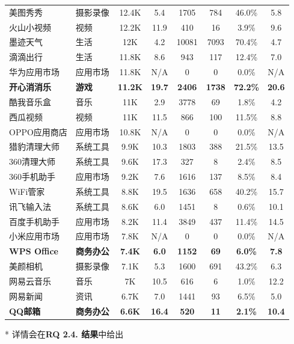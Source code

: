 \begin{ThreePartTable}
\begin{longtable}{l l c c c c c c}
美图秀秀 & 摄影录像 & 12.4K & 5.4 & 1705 & 784 & 46.0\% & 5.8 \\
\rowcolor{gray!15} 火山小视频 & 视频 & 12.2K & 11.9 & 410 & 16 & 3.9\% & 9.6 \\
墨迹天气 & 生活 & 12K & 4.2 & 10081 & 7093 & 70.4\% & 4.7 \\
\rowcolor{gray!15} 滴滴出行 & 生活 & 11.8K & 8.6 & 943 & 117 & 12.4\% & 7.0 \\
华为应用市场 & 应用市场 & 11.8K & N/A & 0 & 0 & 0.0\% & N/A\\
\rowcolor{gray!15} {\bf 开心消消乐}\tnote{*} & {\bf 游戏} & {\bf 11.2K} & {\bf 19.7} & {\bf 2406} & {\bf 1738} & {\bf 72.2\%} & {\bf 20.6} \\
酷我音乐盒 & 音乐 & 11K & 2.9 & 3778 & 69 & 1.8\% & 4.2 \\
\rowcolor{gray!15} 西瓜视频 & 视频 & 11K & 11.5 & 866 & 100 & 11.5\% & 8.8 \\
OPPO应用商店 & 应用市场 & 10.8K & N/A & 0 & 0 & 0.0\% & N/A\\
\rowcolor{gray!15} 猎豹清理大师 & 系统工具 & 9.9K & 10.3 & 1803 & 388 & 21.5\% & 13.5 \\
360清理大师 & 系统工具 & 9.6K & 17.3 & 327 & 8 & 2.4\% & 8.5 \\
\rowcolor{gray!15} 360手机助手 & 应用市场 & 9.2K & 7.6 & 1616 & 137 & 8.5\% & 8.4 \\
WiFi管家 & 系统工具 & 8.8K & 19.5 & 1636 & 658 & 40.2\% & 15.7 \\
\rowcolor{gray!15} 讯飞输入法 & 系统工具 & 8.6K & 6.0 & 1451 & 8 & 0.6\% & 10.1 \\
百度手机助手 & 应用市场 & 8.2K & 11.4 & 3849 & 437 & 11.4\% & 14.5 \\
\rowcolor{gray!15} 小米应用市场 & 应用市场 & 7.8K & N/A & 0 & 0 & 0.0\% & N/A\\
{\bf WPS Office}\tnote{*} & {\bf 商务办公} & {\bf 7.4K} & {\bf 6.0} & {\bf 1152} & {\bf 69} & {\bf 6.0\%} & {\bf 7.8} \\
\rowcolor{gray!15} 美颜相机 & 摄影录像 & 7.1K & 5.3 & 1600 & 691 & 43.2\% & 6.3 \\
网易云音乐 & 音乐 & 7K & 10.5 & 616 & 6 & 1.0\% & 12.2 \\
\rowcolor{gray!15} 网易新闻 & 资讯 & 6.7K & 7.0 & 1441 & 93 & 6.5\% & 5.0 \\
{\bf QQ邮箱}\tnote{*} & {\bf 商务办公} & {\bf 6.6K} & {\bf 16.4} & {\bf 520} & {\bf 11} & {\bf 2.1\%} & {\bf 10.4} \\
\bottomrule
\end{longtable}
\vspace{-4mm}
\begin{tablenotes}
  \item[*] 详情会在{\bf RQ 2.4. 结果}中给出
\end{tablenotes}
\end{ThreePartTable}

